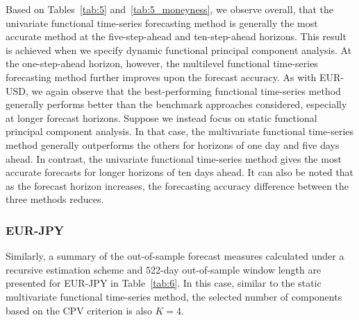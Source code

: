 \documentclass[12pt,a4paper]{article}
\begin{document}
Based on Tables~\ref{tab:5} and~\ref{tab:5_moneyness}, we observe overall, that the univariate functional time-series forecasting method is generally the most accurate method at the five-step-ahead and ten-step-ahead horizons. This result is achieved when we specify dynamic functional principal component analysis. At the one-step-ahead horizon, however, the multilevel functional time-series forecasting method further improves upon the forecast accuracy. As with EUR-USD, we again observe that the best-performing functional time-series method generally performs better than the benchmark approaches considered, especially at longer forecast horizons. Suppose we instead focus on static functional principal component analysis. In that case, the multivariate functional time-series method generally outperforms the others for horizons of one day and five days ahead. In contrast, the univariate functional time-series method gives the most accurate forecasts for longer horizons of ten days ahead. It can also be noted that as the forecast horizon increases, the forecasting accuracy difference between the three methods reduces. 

\subsubsection{EUR-JPY}

Similarly, a summary of the out-of-sample forecast measures calculated under a recursive estimation scheme and 522-day out-of-sample window length are presented for EUR-JPY in Table~\ref{tab:6}. In this case, similar to the static multivariate functional time-series method, the selected number of components based on the CPV criterion is also $K=4$. %
\end{document}
